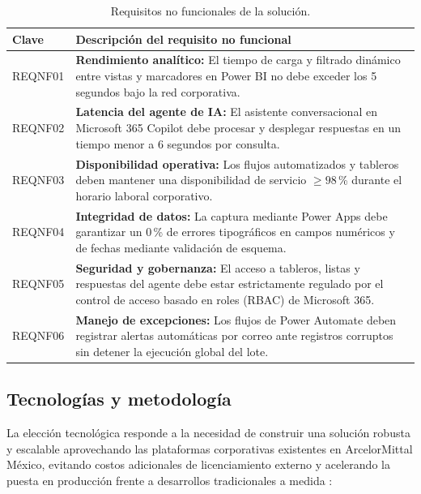 \begin{table}[H]
  \centering
  \caption{Requisitos no funcionales de la solución.}
  \label{tab:rnf}
  \begin{tabular}{@{}p{1.6cm}p{10.4cm}@{}}
    \toprule
    \textbf{Clave} & \textbf{Descripción del requisito no funcional} \\
    \midrule
    REQNF01 & \textbf{Rendimiento analítico:} El tiempo de carga y filtrado dinámico entre vistas y marcadores en Power BI no debe exceder los 5 segundos bajo la red corporativa. \\
    REQNF02 & \textbf{Latencia del agente de IA:} El asistente conversacional en Microsoft 365 Copilot debe procesar y desplegar respuestas en un tiempo menor a 6 segundos por consulta. \\
    REQNF03 & \textbf{Disponibilidad operativa:} Los flujos automatizados y tableros deben mantener una disponibilidad de servicio $\ge 98$\,\% durante el horario laboral corporativo. \\
    REQNF04 & \textbf{Integridad de datos:} La captura mediante Power Apps debe garantizar un 0\,\% de errores tipográficos en campos numéricos y de fechas mediante validación de esquema. \\
    REQNF05 & \textbf{Seguridad y gobernanza:} El acceso a tableros, listas y respuestas del agente debe estar estrictamente regulado por el control de acceso basado en roles (RBAC) de Microsoft 365. \\
    REQNF06 & \textbf{Manejo de excepciones:} Los flujos de Power Automate deben registrar alertas automáticas por correo ante registros corruptos sin detener la ejecución global del lote. \\
    \bottomrule
  \end{tabular}
\end{table}

\subsection{Tecnologías y metodología}

La elección tecnológica responde a la necesidad de construir una solución robusta y escalable aprovechando las plataformas corporativas existentes en ArcelorMittal México, evitando costos adicionales de licenciamiento externo y acelerando la puesta en producción frente a desarrollos tradicionales a medida \cite{harmon2019bpm}:

